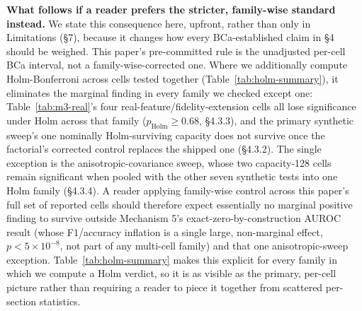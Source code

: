 \documentclass[10pt]{article} %
\begin{document}
\textbf{What follows if a reader prefers the stricter, family-wise standard
instead.} We state this consequence here, upfront, rather than only in
Limitations (§7), because it changes how every BCa-established claim in §4
should be weighed. This paper's pre-committed rule is the unadjusted per-cell
BCa interval, not a family-wise-corrected one. Where we additionally compute
Holm-Bonferroni across cells tested together (Table~\ref{tab:holm-summary}),
it eliminates the marginal finding in every family we checked except one:
Table~\ref{tab:m3-real}'s four real-feature/fidelity-extension cells all lose
significance under Holm across that family ($p_{\text{Holm}}\geq0.68$,
§4.3.3), and the primary synthetic sweep's one nominally Holm-surviving
capacity does not survive once the factorial's corrected control replaces the
shipped one (§4.3.2). The single exception is the anisotropic-covariance
sweep, whose two capacity-128 cells remain significant when pooled with the
other seven synthetic tests into one Holm family (§4.3.4). A reader applying
family-wise control across this paper's full set of reported cells should
therefore expect essentially no marginal positive finding to survive outside
Mechanism 5's exact-zero-by-construction AUROC result (whose F1/accuracy
inflation is a single large, non-marginal effect, $p<5\times10^{-8}$, not part
of any multi-cell family) and that one anisotropic-sweep exception.
Table~\ref{tab:holm-summary} makes this explicit for every family in which we
compute a Holm verdict, so it is as visible as the primary, per-cell picture
rather than requiring a reader to piece it together from scattered
per-section statistics.
\end{document}
